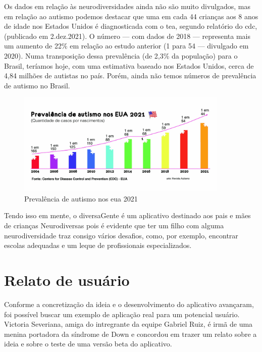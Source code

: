 Os dados em relação às neurodiversidades ainda não são muito divulgados, mas em relação ao autismo podemos destacar que uma em cada 44 crianças aos 8 anos de idade nos Estados Unidos é diagnosticada com o \ac{tea}, segundo relatório do \ac{cdc}, (publicado em 2.dez.2021). O número — com dados de 2018 — representa mais um aumento de 22\% em relação ao estudo anterior (1 para 54 — divulgado em 2020). Numa transposição dessa prevalência (de 2,3\% da população) para o Brasil, teríamos hoje, com uma estimativa baseado nos Estados Unidos, cerca de 4,84 milhões de autistas no país. Porém, ainda não temos números de prevalência de autismo no Brasil.

\begin{figure}[htb]
	
	\centering
	\caption{\label{fig_arq_virado}Prevalência de autismo nos \ac{eua} 2021}
	\includegraphics[width=0.9\textwidth]{anexos/diversaGenteGrafico.png}
\end{figure}

Tendo isso em mente, o diversaGente é um aplicativo destinado aos pais e mães de crianças Neurodiversas  pois é evidente que ter um filho com alguma neurodiversidade traz consigo vários desafios, como, por exemplo, encontrar escolas adequadas e um leque de profissionais especializados.

\section{Relato de usuário}

Conforme a concretização da ideia e o desenvolvimento do aplicativo avançaram, foi possível buscar um exemplo de aplicação real para um potencial usuário. Victoria Severiana, amiga do intregrante da equipe Gabriel Ruiz, é irmã de uma menina portadora da síndrome de Down e concordou em trazer um relato sobre a ideia e sobre o teste de uma versão beta do aplicativo.

